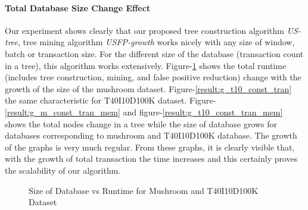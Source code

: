     \paragraph{Total Database Size Change Effect}Our experiment shows clearly that our proposed tree construction algorithm \emph{US-tree}, tree mining algorithm \emph{USFP-growth} works nicely with any size of window, batch or transaction size. For the different size of the database (transaction count in a tree), this algorithm works extensively. Figure-\ref{result:g_m_const_tran} shows the total runtime (includes tree construction, mining, and false positive reduction) change with the growth of the size of the mushroom dataset. Figure-\ref{result:g_t10_const_tran} the same characteristic for T40I10D100K dataset. Figure-\ref{result:g_m_const_tran_mem} and figure-\ref{result:g_t10_const_tran_mem} shows the total nodes change in a tree while the size of database grows for databases corresponding to mushroom and T40I10D100K database. The growth of the graphs is very much regular. From these graphs, it is clearly visible that, with the growth of total transaction the time increases and this certainly proves the scalability of our algorithm. 
        \begin{figure}[h]
        \centering
            
            
        \caption{Size of Database vs Runtime for Mushroom and T40I10D100K Dataset }
        \label{result:g_m_const_tran}
        \end{figure}
%            
